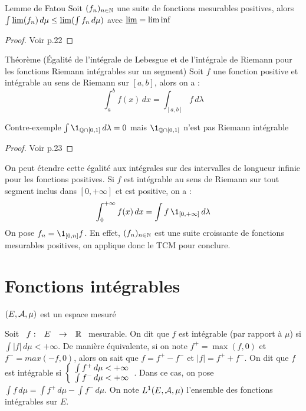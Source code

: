 \documentclass[]{report}
\begin{document}
\begin{tm}{Lemme de Fatou}{}
    Soit $(f_n)_{n\in\mathbb{N}}$ une suite de fonctions mesurables positives, alors $\int \underline{\lim}(f_n)\,d\mu\le\underline{\lim}(\int f_n\,d\mu)$ avec $\underline{\lim}=\liminf$
\end{tm}

\begin{proof}{}{}
    Voir p.22
\end{proof}

\begin{tm}{Théorème (Égalité de l'intégrale de Lebesgue et de l'intégrale de Riemann pour les fonctions Riemann intégrables sur un segment)}{}
    Soit $f$ une fonction positive et intégrable au sens de Riemann sur $[a,b]$, alors on a :
    \[\int_a^b f(x)\,dx=\int_{[a,b]}f\,d\lambda\]
\end{tm}

\begin{ex}{Contre-exemple}{}
    $\int\1_{\Q\cap[0,1]}\,d\lambda=0$ mais $\1_{\Q\cap[0,1]}$ n'est pas Riemann intégrable
\end{ex}

\begin{proof}{}{}
    Voir p.23
\end{proof}

\begin{re}{}{}
    On peut étendre cette égalité aux intégrales sur des intervalles de longueur infinie pour les fonctions positives. Si $f$ est intégrable au sens de Riemann sur tout segment inclus dans $[0,+\infty]$ et est positive, on a :
    $$\int_0^{+\infty}f(x)\,dx=\int f\,\1_{[0,+\infty]}\,d\lambda$$
    On pose $f_n=\1_{[0,n]}f$. En effet, $(f_n)_{n\in\mathbb{N}}$ est une suite croissante de fonctions mesurables positives, on applique donc le TCM pour conclure.
\end{re}

\section{Fonctions intégrables}

$(E,\mathcal{A},\mu)$ est un espace mesuré

\begin{df}{}{}
    Soit $\begin{array}{ccccc} f : & E & \to & \mathbb{R} \end{array}$ mesurable. On dit que $f$ est intégrable (par rapport à $\mu$) si $\int |f|\,d\mu<+\infty$.
    De manière équivalente, si on note $f^+=\max(f,0)$ et $f^-=max(-f,0)$, alors on sait que $f=f^+-f^-$ et $|f|=f^++f^-$. On dit que $f$ est intégrable si $\left\{\begin{array}{ll} \int f^+\,d\mu<+\infty\\
    \int f^-\,d\mu<+\infty \end{array} \right.$.
    Dans ce cas, on pose $\int f\,d\mu=\int f^+\,d\mu-\int f^-\,d\mu$. On note $L^1(E,\mathcal{A},\mu)$ l'ensemble des fonctions intégrables sur $E$.
\end{df}
\end{document}
